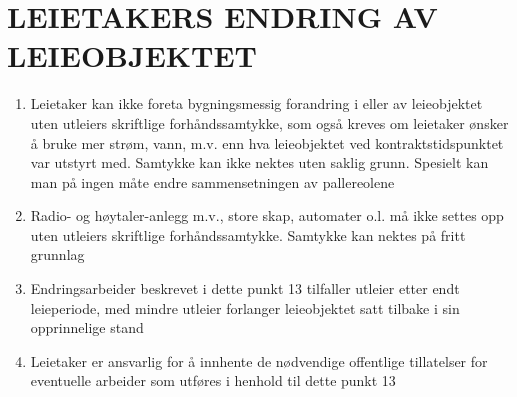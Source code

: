 \section{LEIETAKERS ENDRING AV LEIEOBJEKTET}


    \begin{enumerate}


        \item Leietaker kan ikke foreta bygningsmessig forandring i eller av leieobjektet uten
        utleiers skriftlige forhåndssamtykke, som også kreves om leietaker ønsker å bruke mer strøm, vann,  m.v. enn
        hva leieobjektet ved kontraktstidspunktet var utstyrt med. Samtykke kan ikke nektes uten saklig grunn.
        Spesielt kan man på ingen måte endre sammensetningen av pallereolene

        \item Radio- og høytaler-anlegg m.v., store skap, automater o.l. må ikke settes opp uten utleiers skriftlige
        forhåndssamtykke. Samtykke kan nektes på fritt grunnlag

        \item Endringsarbeider beskrevet i dette punkt 13 tilfaller utleier etter endt leieperiode, med mindre utleier
        forlanger leieobjektet satt tilbake i sin opprinnelige stand

        \item Leietaker er ansvarlig for å innhente de nødvendige offentlige tillatelser for eventuelle arbeider som
        utføres i henhold til dette punkt 13


    \end{enumerate}
